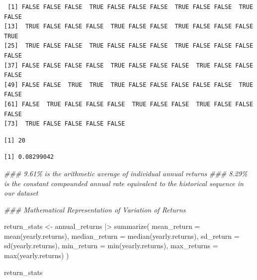 \documentclass[
  letterpaper,
  DIV=11,
  numbers=noendperiod]{scrartcl}
\newenvironment{Shaded}{\begin{snugshade}}{\end{snugshade}}
\newcommand{\AttributeTok}[1]{\textcolor[rgb]{0.40,0.45,0.13}{#1}}
\newcommand{\DecValTok}[1]{\textcolor[rgb]{0.68,0.00,0.00}{#1}}
\newcommand{\DocumentationTok}[1]{\textcolor[rgb]{0.37,0.37,0.37}{\textit{#1}}}
\newcommand{\FunctionTok}[1]{\textcolor[rgb]{0.28,0.35,0.67}{#1}}
\newcommand{\NormalTok}[1]{\textcolor[rgb]{0.00,0.23,0.31}{#1}}
\newcommand{\OtherTok}[1]{\textcolor[rgb]{0.00,0.23,0.31}{#1}}
\newcommand{\SpecialCharTok}[1]{\textcolor[rgb]{0.37,0.37,0.37}{#1}}
\begin{document}
\begin{verbatim}
 [1] FALSE FALSE FALSE  TRUE FALSE FALSE FALSE  TRUE FALSE FALSE  TRUE FALSE
[13]  TRUE FALSE FALSE FALSE  TRUE FALSE FALSE  TRUE FALSE FALSE FALSE  TRUE
[25]  TRUE FALSE FALSE  TRUE FALSE FALSE FALSE  TRUE FALSE FALSE FALSE FALSE
[37] FALSE FALSE FALSE FALSE  TRUE FALSE FALSE FALSE  TRUE FALSE FALSE FALSE
[49] FALSE FALSE  TRUE  TRUE  TRUE FALSE FALSE FALSE FALSE FALSE  TRUE FALSE
[61] FALSE  TRUE FALSE FALSE FALSE  TRUE FALSE FALSE  TRUE FALSE FALSE FALSE
[73]  TRUE FALSE FALSE FALSE FALSE
\end{verbatim}

\begin{Shaded}
\end{Shaded}

\begin{verbatim}
[1] 20
\end{verbatim}

\begin{Shaded}
\end{Shaded}

\begin{verbatim}
[1] 0.08299042
\end{verbatim}

\begin{Shaded}
\begin{Highlighting}[]
\DocumentationTok{\#\#\# 9.61\% is the arithmetic average of individual annual returns}
\DocumentationTok{\#\#\# 8.29\% is the constant compounded annual rate equivalent to the historical sequence in our dataset}

\DocumentationTok{\#\#\# Mathematical Representation of Variation of Returns}

\NormalTok{return\_stats }\OtherTok{\textless{}{-}}\NormalTok{ annual\_returns }\SpecialCharTok{|\textgreater{}} 
    \FunctionTok{summarize}\NormalTok{(}
        \AttributeTok{mean\_return =} \FunctionTok{mean}\NormalTok{(yearly.returns),}
        \AttributeTok{median\_return =} \FunctionTok{median}\NormalTok{(yearly.returns),}
        \AttributeTok{sd\_return =} \FunctionTok{sd}\NormalTok{(yearly.returns),}
        \AttributeTok{min\_return =} \FunctionTok{min}\NormalTok{(yearly.returns),}
        \AttributeTok{max\_returns =} \FunctionTok{max}\NormalTok{(yearly.returns)}
\NormalTok{    )}

\NormalTok{    return\_stats}
\end{Highlighting}
\end{Shaded}
\end{document}
